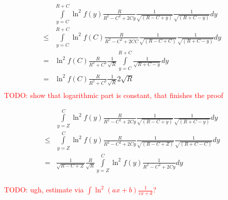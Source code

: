 \documentclass[12pt, a4paper]{article}
\newcommand{\todo}[1]{{\large \textcolor{red}{TODO: #1}}}
\begin{document}
\begin{align*}
    & \int\limits_{y = C}^{R + C} \ln^2 f(y) \frac{R}{R^2 - C^2 + 2 C y} \frac{1}{\sqrt{(R - C + y)}} \frac{1}{\sqrt{(R + C - y)}} dy\\
\le & \int\limits_{y = C}^{R + C} \ln^2 f(C) \frac{R}{R^2 - C^2 + 2 C C} \frac{1}{\sqrt{(R - C + C)}} \frac{1}{\sqrt{(R + C - y)}} dy\\
=   & \ln^2 f(C) \frac{R}{R^2 + C^2} \frac{1}{\sqrt{R}} \int\limits_{y = C}^{R + C} \frac{1}{\sqrt{R + C - y}} dy\\
=   & \ln^2 f(C) \frac{R}{R^2 + C^2} \frac{1}{\sqrt{R}} 2 \sqrt{R}\\
\end{align*}
\todo{show that logarithmic part is constant, that finishes the proof}

\begin{align*} 
    & \int\limits_{y = Z}^{C} \ln^2 f(y) \frac{R}{R^2 - C^2 + 2 C y} \frac{1}{\sqrt{(R - C + y)}} \frac{1}{\sqrt{(R + C - y)}} dy\\
\le & \int\limits_{y = Z}^{C} \ln^2 f(y) \frac{R}{R^2 - C^2 + 2 C y} \frac{1}{\sqrt{(R - C + Z)}} \frac{1}{\sqrt{(R + C - C)}} dy\\
=   & \frac{1}{\sqrt{R - C + Z}} \frac{R}{\sqrt{R}}  \int\limits_{y = Z}^{C} \ln^2 f(y) \frac{1}{R^2 - C^2 + 2 C y} dy\\
\end{align*}

\todo{ugh, estimate via $\int \ln^2(a x + b) \frac{1}{c x + d}$? }
\end{document}
